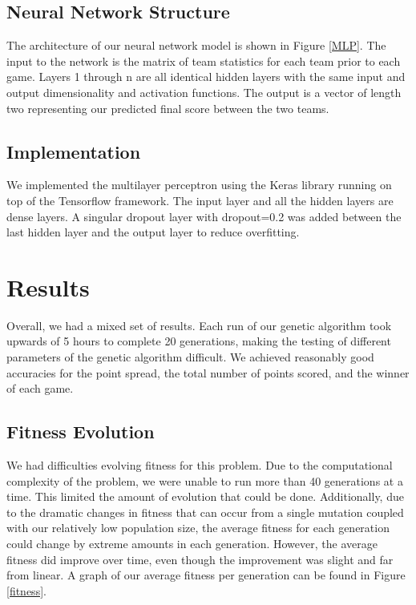 \documentclass[10pt,twocolumn,letterpaper]{article}
\begin{document}
\subsection{Neural Network Structure}
The architecture of our neural network model is shown in Figure \ref{MLP}. The input to the network is the matrix of team statistics for each team prior to each game.  Layers 1 through n are all identical hidden layers with the same input and output dimensionality and activation functions.  The output is a vector of length two representing our predicted final score between the two teams.  

\subsection{Implementation}
We implemented the multilayer perceptron using the Keras library running on top of the Tensorflow framework.  The input layer and all the hidden layers are dense layers.  A singular dropout layer with dropout=0.2 was added between the last hidden layer and the output layer to reduce overfitting.
\section{Results}
Overall, we had a mixed set of results.  Each run of our genetic algorithm took upwards of 5 hours to complete 20 generations, making the testing of different parameters of the genetic algorithm difficult.  We achieved reasonably good accuracies for the point spread, the total number of points scored, and the winner of each game. 
\subsection{Fitness Evolution}
We had difficulties evolving fitness for this problem.  Due to the computational complexity of the problem, we were unable to run more than 40 generations at a time.  This limited the amount of evolution that could be done.  Additionally, due to the dramatic changes in fitness that can occur from a single mutation coupled with our relatively low population size, the average fitness for each generation could change by extreme amounts in each generation.  However, the average fitness did improve over time, even though the improvement was slight and far from linear. A graph of our average fitness per generation can be found in Figure \ref{fitness}.  
\end{document}
